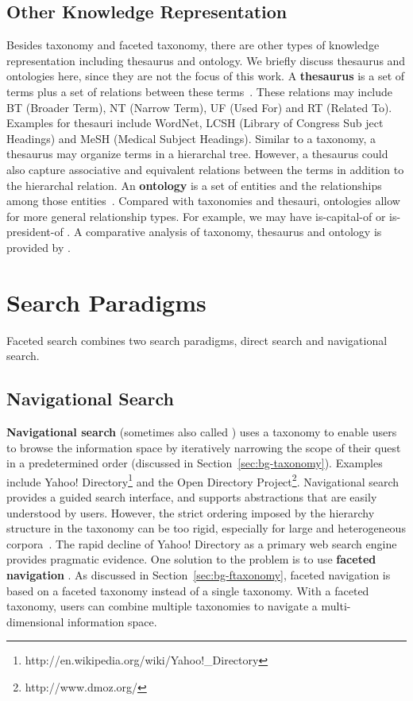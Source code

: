 \subsection{Other Knowledge Representation}
Besides taxonomy and faceted taxonomy, there are other types of knowledge representation including thesaurus and ontology. We briefly discuss thesaurus and ontologies here, since they are not the focus of this work.
A \textbf{thesaurus} is a set of terms plus a set of relations between these terms~\cite{jing1994association}. These relations may include BT (Broader Term), NT (Narrow Term), UF (Used For) and RT (Related To). Examples for thesauri include WordNet, LCSH (Library of Congress Sub ject Headings) and MeSH (Medical Subject Headings). Similar to a taxonomy, a thesaurus may organize terms in a hierarchal tree. However, a thesaurus could also capture associative and equivalent relations between the terms in addition to the hierarchal relation. An \textbf{ontology} is a set of entities and the relationships among those entities~\cite{gruber1993translation}. Compared with taxonomies and thesauri, ontologies allow for more general relationship types. For example, we may
have  is-capital-of  or  is-president-of . A comparative analysis of taxonomy, thesaurus and ontology is provided by \citet{kumar2013comparative}.


\section{Search Paradigms}
Faceted search combines two search paradigms, direct search and navigational search. 
\subsection{Navigational Search}
\label{sec:bg-nsearch}
\textbf{Navigational search} (sometimes also called ) uses a taxonomy to enable users to browse the information space by iteratively narrowing the scope of their quest in a predetermined order (discussed in Section~\ref{sec:bg-taxonomy}). Examples include Yahoo! Directory\footnote{http://en.wikipedia.org/wiki/Yahoo!\_Directory} and the Open Directory Project\footnote{http://www.dmoz.org/}. Navigational search provides a guided search interface, and supports abstractions that are easily understood by users. However, the strict ordering imposed by the hierarchy structure in the taxonomy can be too rigid, especially for large and heterogeneous corpora~\cite{snow2006semantic,tunkelang2009faceted,sacco2009dynamic}. 
The rapid decline of Yahoo! Directory as a primary web search engine provides pragmatic evidence.
One solution to the problem is to use \textbf{faceted navigation} . As discussed in Section~\ref{sec:bg-ftaxonomy}, faceted navigation is based on a faceted taxonomy instead of a single taxonomy. With a faceted taxonomy, users can combine multiple taxonomies to navigate a multi-dimensional information space.

